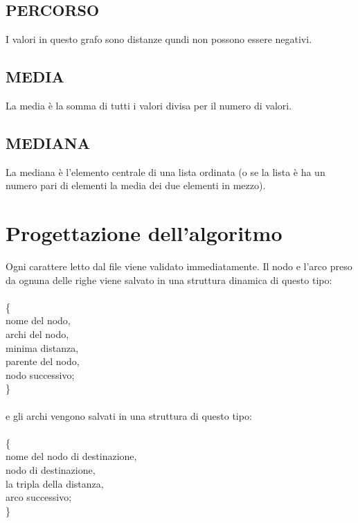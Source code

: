\documentclass[11pt, a4paper, titlepage, block]{article}
\begin{document}
	\subsection{PERCORSO}
	I valori in questo grafo sono distanze qundi non possono essere negativi.
	\subsection{MEDIA}
	La media \`{e} la somma di tutti i valori divisa per il numero di valori.
	\subsection{MEDIANA}
	La mediana \`{e} l'elemento centrale di una lista ordinata (o se la lista \`{e} ha un numero pari di elementi la media dei due elementi in mezzo).\\

	\newpage
\section{Progettazione dell'algoritmo}
	Ogni carattere letto dal file viene validato immediatamente. Il nodo e l'arco preso da ognuna delle righe viene salvato in una struttura dinamica di questo tipo: \\\\
	\{\\
	\indent nome del nodo,\\
	\indent archi del nodo,\\
	\indent minima distanza,\\
	\indent parente del nodo,\\
	\indent nodo successivo; \\
	\}\\\\
	e gli archi vengono salvati in una struttura di questo tipo:\\\\
	\{\\
	\indent nome del nodo di destinazione,\\
	\indent nodo di destinazione,\\
	\indent la tripla della distanza,\\
	\indent arco successivo;\\
	\}\\\\
\end{document}
